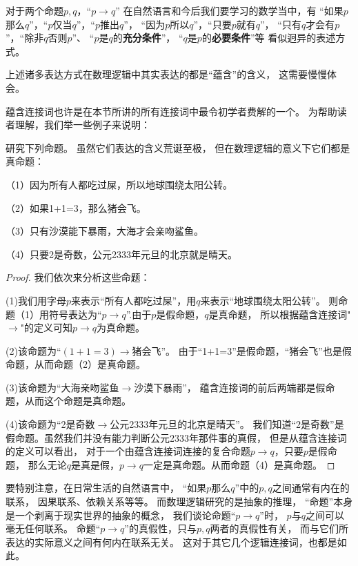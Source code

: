对于两个命题$p,q$，“$p\rightarrow q$”
在自然语言和今后我们要学习的数学当中，有
“如果$p$那么$q$”，“$p$仅当$q$”，“$p$推出$q$”，
“因为$p$所以$q$”，“只要$p$就有$q$”，
“只有$q$才会有$p$”，“除非$q$否则$p$”、
“$p$是$q$的\textbf{充分条件}”，
“$q$是$p$的\textbf{必要条件}”等
看似迥异的表述方式。

上述诸多表达方式在数理逻辑中其实表达的都是“蕴含”的含义，
这需要慢慢体会。

蕴含连接词也许是在本节所讲的所有连接词中最令初学者费解的一个。
为帮助读者理解，我们举一些例子来说明：

\begin{example}研究下列命题。
虽然它们表达的含义荒诞至极，
但在数理逻辑的意义下它们都是真命题：

（1）因为所有人都吃过屎，所以地球围绕太阳公转。

（2）如果1+1=3，那么猪会飞。

（3）只有沙漠能下暴雨，大海才会亲吻鲨鱼。

（4）只要2是奇数，公元2333年元旦的北京就是晴天。
\end{example}
\begin{proof}
我们依次来分析这些命题：

(1)我们用字母$p$来表示“所有人都吃过屎”，用$q$来表示“地球围绕太阳公转”。
则命题（1）用符号表达为“$p\rightarrow q$”.由于$p$是假命题，$q$是真命题，
所以根据蕴含连接词"$\rightarrow$"的定义可知$p\rightarrow q$为真命题。

(2)该命题为“$(1+1=3)\rightarrow\text{猪会飞}$”。
由于“1+1=3”是假命题，“猪会飞”也是假命题，从而命题（2）是真命题。

(3)该命题为“大海亲吻鲨鱼$\rightarrow$沙漠下暴雨”，
蕴含连接词的前后两端都是假命题，从而这个命题是真命题。

(4)该命题为“2是奇数$\rightarrow$公元2333年元旦的北京是晴天”。
我们知道“2是奇数”是假命题。虽然我们并没有能力判断公元2333年那件事的真假，
但是从蕴含连接词的定义可以看出，
对于一个由蕴含连接词连接的复合命题$p\rightarrow q$，只要$p$是假命题，
那么无论$q$是真是假，$p\rightarrow q$一定是真命题。从而命题（4）是真命题。
\end{proof}

要特别注意，在日常生活的自然语言中，
“如果$p$那么$q$”中的$p,q$之间通常有内在的联系，
因果联系、依赖关系等等。
而数理逻辑研究的是抽象的推理，
“命题”本身是一个剥离于现实世界的抽象的概念，
我们谈论命题“$p\rightarrow q$”时，
$p$与$q$之间可以毫无任何联系。
命题“$p\rightarrow q$”的真假性，只与$p,q$两者的真假性有关，
而与它们所表达的实际意义之间有何内在联系无关。
这对于其它几个逻辑连接词，也都是如此。

